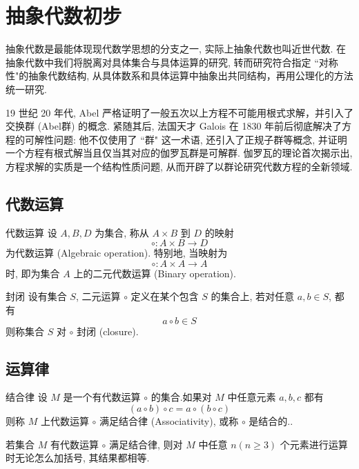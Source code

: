 \documentclass[cn,toc=twocol]{elegantbook}
\begin{document}
\section{抽象代数初步}

抽象代数是最能体现现代数学思想的分支之一, 实际上抽象代数也叫近世代数. 在抽象代数中我们将脱离对具体集合与具体运算的研究, 转而研究符合指定 ``对称性"的抽象代数结构, 从具体数系和具体运算中抽象出共同结构，再用公理化的方法统一研究.

19 世纪 20 年代, Abel 严格证明了一般五次以上方程不可能用根式求解，并引入了交换群 (Abel群) 的概念. 紧随其后, 法国天才 Galois 在 1830 年前后彻底解决了方程的可解性问题: 他不仅使用了 ``群" 这一术语, 还引入了正规子群等概念, 并证明一个方程有根式解当且仅当其对应的伽罗瓦群是可解群. 伽罗瓦的理论首次揭示出, 方程求解的实质是一个结构性质问题, 从而开辟了以群论研究代数方程的全新领域.

\subsection{代数运算}

\begin{definition}{代数运算}
	设 $A, B, D$ 为集合, 称从 $A \times B$ 到 $D$ 的映射
	\[
		\circ: A \times B \rightarrow D
	\]
	为代数运算 (Algebraic operation). 特别地, 当映射为
	\[
		\circ: A \times A \rightarrow A
	\]
	时, 即为集合 $A$ 上的二元代数运算 (Binary operation).
\end{definition}

\begin{definition}{封闭}
	设有集合 $S$, 二元运算 $\circ$ 定义在某个包含 $S$ 的集合上, 若对任意 $a,b \in S$, 都有
	\[
		a \circ b \in S
	\]
	则称集合 $S$ 对 $\circ$ 封闭 (closure).
\end{definition}

\subsection{运算律}

\begin{definition}{结合律}{}
设 $M$ 是一个有代数运算 $\circ$ 的集合.如果对 $M$ 中任意元素 $a, b, c$ 都有
\[
	(a\circ b) \circ c = a \circ (b \circ c)
\]
则称 $M$ 上代数运算 $\circ$ 满足结合律 (Associativity), 或称 $\circ$ 是结合的..
\end{definition}

\begin{theorem}
	若集合 $M$ 有代数运算 $\circ$ 满足结合律, 则对 $M$ 中任意 $n(n\ge 3)$ 个元素进行运算时无论怎么加括号, 其结果都相等.
\end{theorem}
\end{document}
